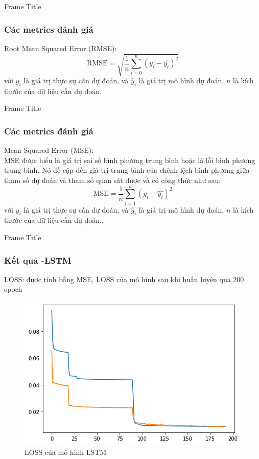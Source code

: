 \documentclass[notheorems,hyperref={bookmarks=true}]{beamer}
\theoremstyle{plain}
\numberwithin{equation}{section}
\begin{document}
\begin{footnotesize}
    
    
    \begin{frame}{Frame Title}
	\frametitle{Các metrics đánh giá}
    Root Mean Squared Error (RMSE):
    \begin{equation}
    \text{RMSE} = \sqrt{\frac{1}{n}\sum_{i=0}^n(y_i - \hat{y_i})^2}
    \end{equation}
    với $y_i$ là giá trị thực sự cần dự đoán, và $\hat{y}_i$ là giá trị mô hình dự đoán, $n$ là kích thước của dữ liệu cần dự đoán.
    \end{frame}
    
    \begin{frame}{Frame Title}
	\frametitle{Các metrics đánh giá}
Mean Squared Error (MSE):\\
MSE được hiểu là giá trị sai số bình phương trung bình hoặc là lỗi bình phương trung bình. Nó đề cập đến giá trị trung bình của chênh lệch bình phương giữa tham số dự đoán và tham số quan sát được và có công thức như sau:
\begin{equation}
    \text{MSE} = \frac{1}{n}\sum_{i=1}^n(y_i - \hat{y_i})^2
\end{equation}
với $y_i$ là giá trị thực sự cần dự đoán, và $\hat{y}_i$ là giá trị mô hình dự đoán, $n$ là kích thước của dữ liệu cần dự đoán..
    \end{frame}
    
    \begin{frame}{Frame Title}
	\frametitle{Kết quả -LSTM}
    LOSS: được tính bằng MSE, LOSS của mô hình sau khi huấn luyện qua 200 epoch
    \begin{figure}[H]
    \centering
    \includegraphics[width=.85\textwidth]{figures/LOSS_LSTM.png}
    \caption[LOSS của mô hình LSTM]{LOSS của mô hình LSTM}
    \end{figure}    
	\end{frame}
	

\end{footnotesize}
\end{document}
